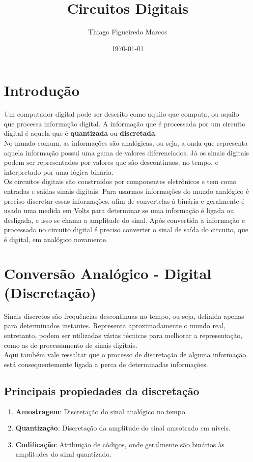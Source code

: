\documentclass[12pt, onecolumn]{article}
\title{Circuitos Digitais}
\author{Thiago Figueiredo Marcos}
\date{\today}
\begin{document}
	
	\maketitle

	\section{\centering Introdução}
	
	Um computador digital pode ser descrito como aquilo que computa, ou aquilo 
	que processa informação digital. A informação que é processada por 
	um circuito digital é aquela que é \textbf{quantizada} ou 
	\textbf{discretada}. \\
	\newline
	No mundo comum, as informações são analógicas, ou seja, a onda que 
	representa aquela informação possui uma gama de valores diferenciados. 
	Já os sinais digitais podem ser representados por valores que são descontinuos, 
	no tempo, e interpretado por uma lógica binária. \\ 
	\newline
	Os circuitos digitais são construidos por componentes eletrônicos e 
	tem como entradas e saidas sinais digitais. Para usarmos informações 
	do mundo analógico é preciso discretar essas informações, afím de 
	convertelas à binária e geralmente é usado uma medida em Volts para 
	determinar se uma informação é ligada ou desligada, e isso se chama a
	amplitude do sinal. 
	Após convertida a informação e processada no circuito digital é 
	preciso converter o sinal de saída do circuito, que é digital, 
	em analógico novamente.

	\section{\centering Conversão Analógico - Digital (Discretação)}
	
	Sinais discretos são frequências descontinuas no tempo, ou seja, 
	definida apenas para determinados instantes. Representa aproximadamente 
	o mundo real, entretanto, podem ser utilizadas várias técnicas para 
	melhorar a representação, como as de processamento de sinais digitais.\\
	\newline
	Aqui também vale ressaltar que o processo de discretação de alguma 
	informação está consequentemente ligada a perca de determinadas 
	informações.
		
	\subsection{\centering Principais propiedades da discretação}	
	\begin{enumerate}
		\item\textbf{Amostragem}: Discretação do sinal analógico no tempo.
		\item\textbf{Quantização}: Discretação da amplitude 
			do sinal amsotrado em niveis.
		\item\textbf{Codificação}: Atribuição de códigos, onde geralmente 
				são binários às	amplitudes do sinal quantizado.
	\end{enumerate}
\end{document}
